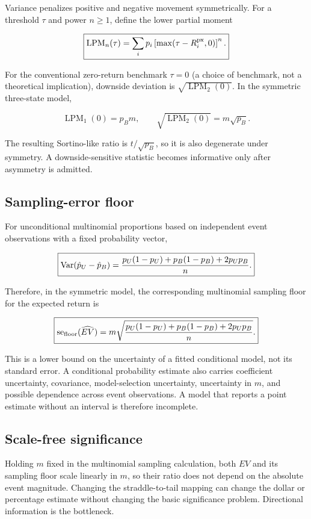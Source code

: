 Variance penalizes positive and negative movement symmetrically. For a threshold
$\tau$ and power $n\ge 1$, define the lower partial moment

\[
\boxed{
\operatorname{LPM}_n(\tau)
=\sum_i p_i\left[\max(\tau-R^{\mathrm{px}}_i,0)\right]^n.
}
\]

For the conventional zero-return benchmark $\tau=0$ (a choice of benchmark,
not a theoretical implication), downside deviation is
$\sqrt{\operatorname{LPM}_2(0)}$. In the symmetric three-state model,

\[
\operatorname{LPM}_1(0)=p_Bm,
\qquad
\sqrt{\operatorname{LPM}_2(0)}=m\sqrt{p_B}.
\]

The resulting Sortino-like ratio is $t/\sqrt{p_B}$, so it is also degenerate
under symmetry. A downside-sensitive statistic becomes informative only after
asymmetry is admitted.

\subsection{Sampling-error floor}

For unconditional multinomial proportions based on independent event
observations with a fixed probability vector,

\[
\boxed{
\operatorname{Var}(\hat p_U-\hat p_B)
=\frac{p_U(1-p_U)+p_B(1-p_B)+2p_Up_B}{n}.
}
\]

Therefore, in the symmetric model, the corresponding multinomial sampling
floor for the expected return is

\[
\boxed{
\operatorname{se}_{\mathrm{floor}}(\widehat{EV})
=m\sqrt{\frac{p_U(1-p_U)+p_B(1-p_B)+2p_Up_B}{n}}.
}
\]

This is a lower bound on the uncertainty of a fitted conditional model, not its
standard error. A conditional probability estimate also carries coefficient
uncertainty, covariance, model-selection uncertainty, uncertainty in $m$, and
possible dependence across event observations. A model that reports a point
estimate without an interval is therefore incomplete.

\subsection{Scale-free significance}

Holding $m$ fixed in the multinomial sampling calculation, both $EV$ and its
sampling floor scale linearly in $m$, so their ratio does not depend on the
absolute event magnitude. Changing the straddle-to-tail
mapping can change the dollar or percentage estimate without changing the basic
significance problem. Directional information is the bottleneck.

